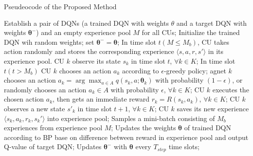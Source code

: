 \documentclass{article}
\begin{document}
\renewcommand{\algorithmicrequire}{\textbf{Input:}}  %
\renewcommand{\algorithmicensure}{\textbf{Output:}} %
\begin{algorithm}[h]
	\caption{Pseudeocode of the Proposed Method} 
	\label{alg}
	\begin{algorithmic}[1]
		\State Establish a pair of DQNs (a trained DQN with weights 
		$\theta$ and a target DQN with weights $\bm{\theta}^-$) and an empty
		experience pool $M$ for all CUs;
		\State Initialize the trained DQN wih random weights; set $\bm{\theta}^-=\bm{\theta}$;
		\State In time slot $t(M \leq M_b)$, CU takes action randomly and stores 
		the corresponding experience $\langle s, a, r, s' \rangle$ in its experience pool.
		\Repeat
		\State CU $k$ observe its state $s_k$ in time slot $t$, $\forall k \in K$;
		\State In time slot $t(t>M_b)$ CU $k$ chooses an action $a_k$ according to $\epsilon$-greedy 
		policy; agnet $k$ chooses an action $a_k=\arg\max_{a \in A}q(s_k, a; \bm{\theta}_k)$ with probability
		$(1-\epsilon)$, or randomly chooses an action $a_k \in A$ with probability $\epsilon$, $\forall k \in K$;
		\State CU $k$ executes the chosen action $a_k$, then gets an immediate reward $r_k=R(s_k, a_k)$, $\forall k \in K$;
		\State CU $k$ observes a new state $s'_k$ in time slot $t+1$, $\forall k \in K$;
		\State CU $k$ saves its new experience $\langle s_k, a_k, r_k, s_k' \rangle$ into experience pool;
		\State Samples a mini-batch consisting of $M_b$ experiences from experience pool $M$;
		\State Updates the weights $\bm{\theta}$ of trained DQN according to BP base on difference between reward 
		in experience pool and output Q-value of target DQN;
		\State Updates $\bm{\theta}^-$ with $\bm{\theta}$ every $T_{step}$ time slots;
	\end{algorithmic}
\end{algorithm}
\end{document}
